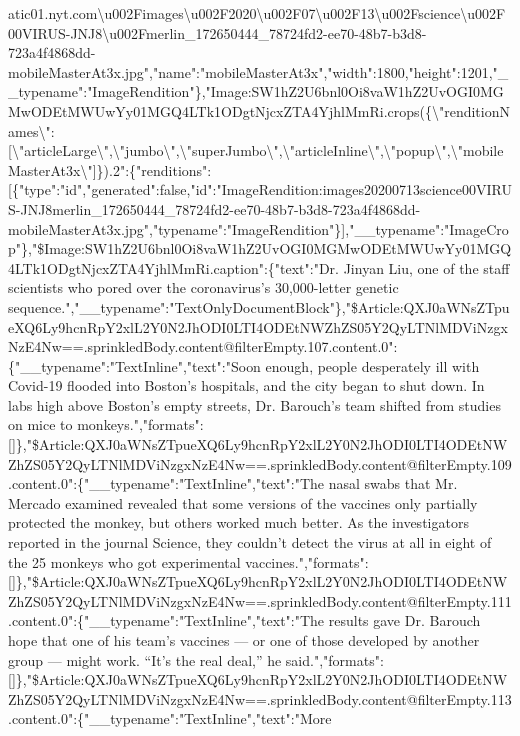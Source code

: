 atic01.nyt.com\textbackslash{}u002Fimages\textbackslash{}u002F2020\textbackslash{}u002F07\textbackslash{}u002F13\textbackslash{}u002Fscience\textbackslash{}u002F00VIRUS-JNJ8\textbackslash{}u002Fmerlin\_172650444\_78724fd2-ee70-48b7-b3d8-723a4f4868dd-mobileMasterAt3x.jpg","name":"mobileMasterAt3x","width":1800,"height":1201,"\_\_typename":"ImageRendition"\},"Image:SW1hZ2U6bnl0Oi8vaW1hZ2UvOGI0MGMwODEtMWUwYy01MGQ4LTk1ODgtNjcxZTA4YjhlMmRi.crops(\{\textbackslash{}"renditionNames\textbackslash{}":{[}\textbackslash{}"articleLarge\textbackslash{}",\textbackslash{}"jumbo\textbackslash{}",\textbackslash{}"superJumbo\textbackslash{}",\textbackslash{}"articleInline\textbackslash{}",\textbackslash{}"popup\textbackslash{}",\textbackslash{}"mobileMasterAt3x\textbackslash{}"{]}\}).2":\{"renditions":{[}\{"type":"id","generated":false,"id":"ImageRendition:images20200713science00VIRUS-JNJ8merlin\_172650444\_78724fd2-ee70-48b7-b3d8-723a4f4868dd-mobileMasterAt3x.jpg","typename":"ImageRendition"\}{]},"\_\_typename":"ImageCrop"\},"\$Image:SW1hZ2U6bnl0Oi8vaW1hZ2UvOGI0MGMwODEtMWUwYy01MGQ4LTk1ODgtNjcxZTA4YjhlMmRi.caption":\{"text":"Dr.
Jinyan Liu, one of the staff scientists who pored over the coronavirus's
30,000-letter genetic
sequence.","\_\_typename":"TextOnlyDocumentBlock"\},"\$Article:QXJ0aWNsZTpueXQ6Ly9hcnRpY2xlL2Y0N2JhODI0LTI4ODEtNWZhZS05Y2QyLTNlMDViNzgxNzE4Nw==.sprinkledBody.content@filterEmpty.107.content.0":\{"\_\_typename":"TextInline","text":"Soon
enough, people desperately ill with Covid-19 flooded into Boston's
hospitals, and the city began to shut down. In labs high above Boston's
empty streets, Dr. Barouch's team shifted from studies on mice to
monkeys.","formats":{[}{]}\},"\$Article:QXJ0aWNsZTpueXQ6Ly9hcnRpY2xlL2Y0N2JhODI0LTI4ODEtNWZhZS05Y2QyLTNlMDViNzgxNzE4Nw==.sprinkledBody.content@filterEmpty.109.content.0":\{"\_\_typename":"TextInline","text":"The
nasal swabs that Mr. Mercado examined revealed that some versions of the
vaccines only partially protected the monkey, but others worked much
better. As the investigators reported in the journal Science, they
couldn't detect the virus at all in eight of the 25 monkeys who got
experimental
vaccines.","formats":{[}{]}\},"\$Article:QXJ0aWNsZTpueXQ6Ly9hcnRpY2xlL2Y0N2JhODI0LTI4ODEtNWZhZS05Y2QyLTNlMDViNzgxNzE4Nw==.sprinkledBody.content@filterEmpty.111.content.0":\{"\_\_typename":"TextInline","text":"The
results gave Dr. Barouch hope that one of his team's vaccines --- or one
of those developed by another group --- might work. ``It's the real
deal,'' he
said.","formats":{[}{]}\},"\$Article:QXJ0aWNsZTpueXQ6Ly9hcnRpY2xlL2Y0N2JhODI0LTI4ODEtNWZhZS05Y2QyLTNlMDViNzgxNzE4Nw==.sprinkledBody.content@filterEmpty.113.content.0":\{"\_\_typename":"TextInline","text":"More
